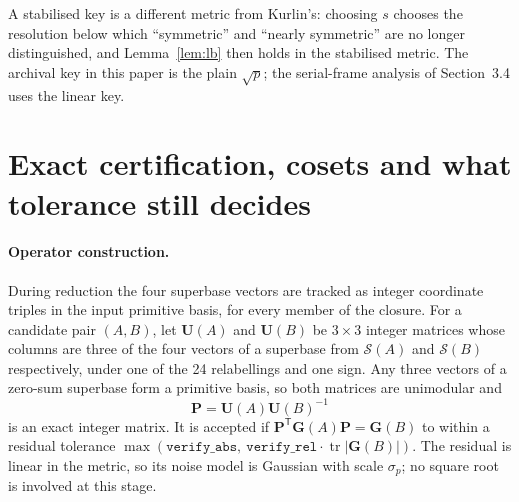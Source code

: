\documentclass[11pt]{article}
\newcommand{\Gmet}{\mathbf{G}}
\newcommand{\Pop}{\mathbf{P}}
\newcommand{\Uop}{\mathbf{U}}
\newcommand{\Sclosure}{\mathcal{S}}
\begin{document}
A stabilised key is a different metric from Kurlin's: choosing $s$ chooses the resolution below which ``symmetric'' and ``nearly symmetric'' are no longer distinguished, and Lemma~\ref{lem:lb} then holds in the stabilised metric. The archival key in this paper is the plain $\sqrt p$; the serial-frame analysis of Section~3.4 uses the linear key.

\section{Exact certification, cosets and what tolerance still decides}
\label{app:exact}

\paragraph{Operator construction.}
During reduction the four superbase vectors are tracked as integer coordinate triples in the input primitive basis, for every member of the closure. For a candidate pair $(A,B)$, let $\Uop(A)$ and $\Uop(B)$ be $3\times3$ integer matrices whose columns are three of the four vectors of a superbase from $\Sclosure(A)$ and $\Sclosure(B)$ respectively, under one of the 24 relabellings and one sign. Any three vectors of a zero-sum superbase form a primitive basis, so both matrices are unimodular and
\[
\Pop=\Uop(A)\Uop(B)^{-1}
\]
is an exact integer matrix. It is accepted if $\Pop^{\mathsf T}\Gmet(A)\Pop=\Gmet(B)$ to within a residual tolerance $\max(\texttt{verify\_abs},\ \texttt{verify\_rel}\cdot\operatorname{tr}|\Gmet(B)|)$. The residual is linear in the metric, so its noise model is Gaussian with scale $\sigma_p$; no square root is involved at this stage.
\end{document}
